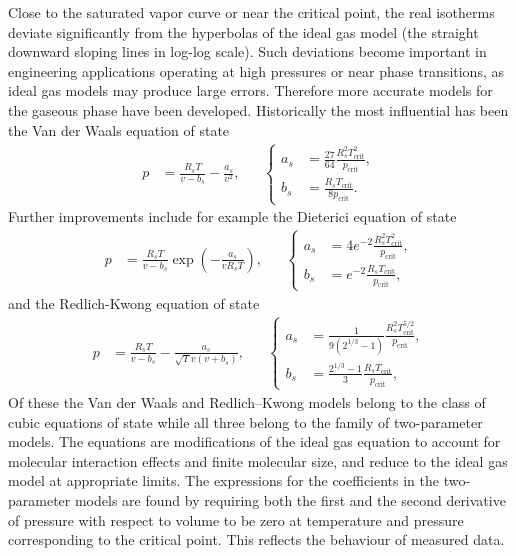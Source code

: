 Close to the saturated vapor curve or near the critical point, the real isotherms deviate significantly from the hyperbolas of the ideal gas model (the straight downward sloping lines in log-log scale). Such deviations become important in engineering applications operating at high pressures or near phase transitions, as ideal gas models may produce large errors. Therefore more accurate models for the gaseous phase have been developed. Historically the most influential has been the Van der Waals equation of state
\begin{align}
    p&=\frac{R_sT}{v-b_s}-\frac{a_s}{v^2}, & &\left\{\begin{aligned}
    a_s&=\frac{27}{64}\frac{R_s^2T_\text{crit}^2}{p_\text{crit}},\\
    b_s&=\frac{R_sT_\text{crit}}{8p_\text{crit}}.
\end{aligned}\right.
\end{align}
Further improvements include for example the Dieterici equation of state
\begin{align}
    p&=\frac{R_sT}{v-b_s}\exp\left(-\frac{a_s}{vR_sT}\right), & &\left\{\begin{aligned}
    a_s&=4e^{-2}\frac{R_s^2T_\text{crit}^2}{p_\text{crit}},\\
    b_s&=e^{-2}\frac{R_sT_\text{crit}}{p_\text{crit}},
    \end{aligned}\right.
\end{align}
and the Redlich-Kwong equation of state
\begin{align}
    p&=\frac{R_sT}{v-b_s}-\frac{a_s}{\sqrt{T} v(v+b_s)}, & &\left\{\begin{aligned}
    a_s&=\frac{1}{9(2^{1/3}-1)}\frac{R_s^2 T^{5/2}_\text{crit}}{p_\text{crit}},\\
    b_s&=\frac{2^{1/3}-1}{3}\frac{R_sT_\text{crit}}{p_\text{crit}},
    \end{aligned}\right.
\end{align}
Of these the Van der Waals and Redlich–Kwong models belong to the class of cubic equations of state while all three belong to the family of two-parameter models. The equations are modifications of the ideal gas equation to account for molecular interaction effects and finite molecular size, and reduce to the ideal gas model at appropriate limits. The expressions for the coefficients in the two-parameter models are found by requiring both the first and the second derivative of pressure with respect to volume to be zero at temperature and pressure corresponding to the critical point. This reflects the behaviour of measured data. 
